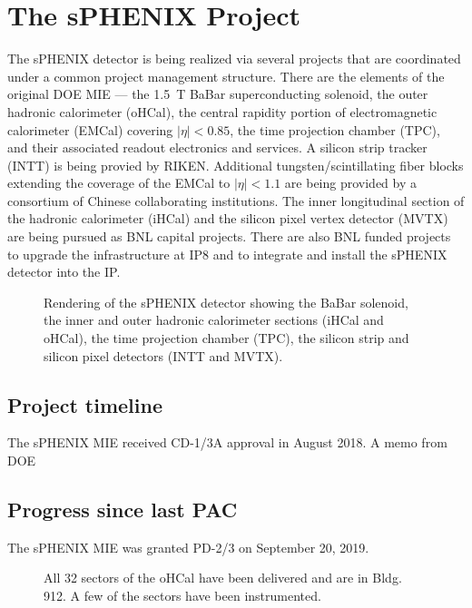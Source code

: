 \chapter{The sPHENIX Project}
\label{chap:project}

The sPHENIX detector is being realized via several projects that are
coordinated under a common project management structure.  There are
the elements of the original DOE MIE --- the 1.5~T BaBar
superconducting solenoid, the outer hadronic calorimeter (oHCal), the
central rapidity portion of electromagnetic calorimeter (EMCal)
covering $|\eta| < 0.85$, the time projection chamber (TPC), and their
associated readout electronics and services.  A silicon strip tracker
(INTT) is being provied by RIKEN.  Additional tungsten/scintillating
fiber blocks extending the coverage of the EMCal to $|\eta| < 1.1$ are
being provided by a consortium of Chinese collaborating institutions.
The inner longitudinal section of the hadronic calorimeter (iHCal) and
the silicon pixel vertex detector (MVTX) are being pursued as BNL
capital projects.  There are also BNL funded projects to upgrade the
infrastructure at IP8 and to integrate and install the sPHENIX
detector into the IP.

\begin{figure}[!hbt]
 \begin{center}
        \caption{\label{fig:full_detector}Rendering of the sPHENIX
        detector showing the BaBar solenoid, the inner and outer
        hadronic calorimeter sections (iHCal  and oHCal), the time
        projection chamber (TPC), the silicon strip and silicon pixel
        detectors (INTT and MVTX).}
 \end{center}
\end{figure}

\section{Project timeline}
\label{sec:timeline}

The sPHENIX MIE received CD-1/3A approval in August 2018.  A memo from DOE 

\section{Progress since last PAC}
\label{sec:progress}

The sPHENIX MIE was granted PD-2/3 on September 20, 2019.

\begin{figure}[!hbt]
 \begin{center}
        \caption{\label{fig:ohcal}All 32 sectors of the oHCal have
        been delivered and are in Bldg. 912.  A few of the sectors have
        been instrumented.}
 \end{center}
\end{figure}

